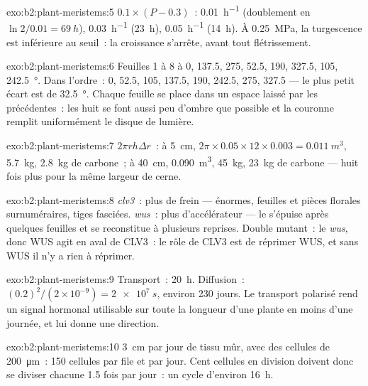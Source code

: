\begin{solution}{exo:b2:plant-meristems:5}
$0.1\times(P - 0.3)$~: \qty{0.01}{h^{-1}} (doublement en
$\ln 2/0.01 =
\qty{69}{h}$), \qty{0.03}{h^{-1}} (\qty{23}{h}), \qty{0.05}{h^{-1}}
(\qty{14}{h}). À \qty{0.25}{MPa}, la turgescence est inférieure au
seuil~: la croissance s'arrête, avant tout flétrissement.
\end{solution}

\begin{solution}{exo:b2:plant-meristems:6}
Feuilles 1 à 8 à 0, 137.5, 275, 52.5, 190, 327.5, 105,
\qty{242.5}{\degree}. Dans l'ordre~: 0, 52.5, 105, 137.5, 190, 242.5,
275, 327.5 --- le plus petit écart est de \qty{32.5}{\degree}. Chaque
feuille se place dans un espace laissé par les précédentes~: les huit se
font aussi peu d'ombre que possible et la couronne remplit
uniformément le disque de lumière.
\end{solution}

\begin{solution}{exo:b2:plant-meristems:7}
$2\pi r h\Delta r$~: à \qty{5}{cm}, $2\pi\times 0.05\times 12\times
0.003 = \qty{0.011}{m^3}$, \qty{5.7}{kg}, \qty{2.8}{kg} de carbone~; à
\qty{40}{cm}, \qty{0.090}{m^3}, \qty{45}{kg}, \qty{23}{kg} de carbone
--- huit fois plus pour la même largeur de cerne.
\end{solution}

\begin{solution}{exo:b2:plant-meristems:8}
\emph{clv3}~: plus de frein ---  énormes, feuilles et pièces
florales surnuméraires, tiges fasciées. \emph{wus}~: plus
d'accélérateur --- le  s'épuise après quelques feuilles et se
reconstitue à plusieurs reprises. Double mutant~: le 
\emph{wus}, donc WUS agit en aval de CLV3~: le rôle de CLV3 est de
réprimer WUS, et sans WUS il n'y a rien à réprimer.
\end{solution}

\begin{solution}{exo:b2:plant-meristems:9}
Transport~: \qty{20}{h}. Diffusion~: $(0.2)^{2}/(2\times 10^{-9}) =
\qty{2e7}{s}$, environ 230 jours. Le transport polarisé rend un signal
hormonal utilisable sur toute la longueur d'une plante en moins d'une
journée, et lui donne une direction.
\end{solution}

\begin{solution}{exo:b2:plant-meristems:10}
\qty{3}{cm} par jour de tissu mûr, avec des cellules de
\qty{200}{\micro m}~: \num{150} cellules par file et par jour. Cent
cellules en division doivent donc se diviser chacune 1.5 fois par jour~:
un cycle d'environ \qty{16}{h}.
\end{solution}

